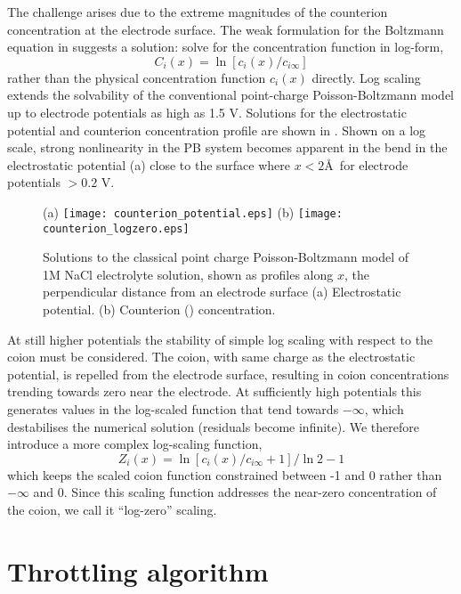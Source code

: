 The challenge arises due to the extreme magnitudes of the counterion
concentration at the electrode surface. The weak formulation for the
Boltzmann equation in  suggests a solution:
solve for the concentration function in log-form,
\begin{equation}
C_{i}(x) = \ln[ c_{i}(x) / c_{i\infty}]
\label{log_scaling}
\end{equation}
rather than the physical concentration function $c_{i}(x)$ directly. Log
scaling extends the solvability of the conventional point-charge Poisson-Boltzmann
model up to electrode potentials as high as 1.5 V. Solutions for the
electrostatic potential and counterion concentration profile are shown
in . Shown on a log scale, strong
nonlinearity in the PB system becomes apparent in the bend in the
electrostatic potential (a) close to the
surface where $x<2$\AA\ for electrode potentials $> 0.2$ V.


\begin{figure}
\centering
(a)
\texttt{[image: counterion\_potential.eps]}
(b)
\texttt{[image: counterion\_logzero.eps]}
\caption{\label{fig_classical_PB}Solutions to the classical point
  charge Poisson-Boltzmann model of 1M NaCl electrolyte solution,
  shown as profiles along $x$, the perpendicular distance from an
  electrode surface (a) Electrostatic potential. (b) Counterion
  () concentration. }
\end{figure}

At still higher potentials the stability of simple log scaling with
respect to the coion must be considered. The coion, with same charge
as the electrostatic potential, is repelled from the electrode surface,
resulting in coion concentrations trending towards zero near the electrode. At
sufficiently high potentials this generates values in the log-scaled
function that tend towards $-\infty$, which destabilises the numerical
solution (residuals become infinite). We therefore introduce a more complex log-scaling function,
\begin{equation}
Z_i(x) = \ln\left[c_i(x)/c_{i\infty}+1\right]/\ln 2 - 1
\label{log_zero}
\end{equation}
which keeps the scaled coion function constrained between -1 and 0
rather than $-\infty$ and 0. Since this scaling function addresses the
near-zero concentration of the coion, we call it ``log-zero'' scaling.

\section{Throttling algorithm}

